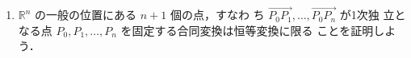 \documentclass[11pt, uplatex, dvipdfmx, titlepage]{jsarticle}
\makeatletter
\renewcommand{\bar}[1]{\overline{#1}}
\renewenvironment{proof}[1][\proofname]{\par
  \pushQED{\qed}%
  \normalfont \topsep6\p@\@plus6\p@\relax
  \trivlist
  \item[\hskip\labelsep
         \bfseries
    {#1}]\ignorespaces
}{%
  \popQED\endtrivlist\@endpefalse
}
\theoremstyle{definition}
\renewcommand{\proofname}{\textbf{証明}}
\makeatother
\begin{document}
\begin{enumerate}
  \setlength{\itemsep}{1zh}

\item $\mathbb{R}^n$ の一般の位置にある $n+1$ 個の点，すなわ
  ち $\overrightarrow{P_0P_1}, \ldots, \overrightarrow{P_0P_n}$ が1次独
  立となる点 $P_0, P_1, \ldots, P_n$ を固定する合同変換は恒等変換に限る
  ことを証明しよう．



    
    
    
    
    



\end{enumerate}
\end{document}
